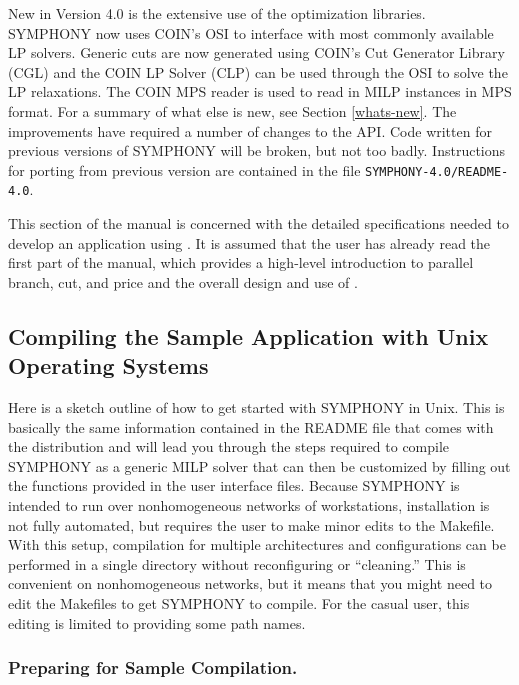 New in Version 4.0 is the extensive use of the
 optimization libraries.
SYMPHONY now uses COIN's OSI to interface with most commonly available LP
solvers. Generic cuts are now generated using COIN's Cut Generator Library
(CGL) and the COIN LP Solver (CLP) can be used through the OSI to solve the LP
relaxations. The COIN MPS reader is used to read in MILP instances in MPS
format. For a summary of what else is new, see Section \ref{whats-new}. The
improvements have required a number of changes to the API. Code written for
previous versions of SYMPHONY will be broken, but not too badly. Instructions
for porting from previous version are contained in the file
\texttt{SYMPHONY-4.0/README-4.0}.

This section of the manual is concerned with the detailed
specifications needed to develop an application using \BB. It is
assumed that the user has already read the first part of the manual, which
provides a high-level introduction to parallel branch, cut, and price
and the overall design and use of \BB. 


\subsection{Compiling the Sample Application with Unix Operating Systems}
\label{getting_started_unix}

Here is a sketch outline of how to get started with SYMPHONY in Unix. This is
basically the same information contained in the README file that comes with
the distribution and will lead you through the steps required to compile
SYMPHONY as a generic MILP solver that can then be customized by filling out
the functions provided in the user interface files. Because SYMPHONY is
intended to run over nonhomogeneous networks of workstations, installation is
not fully automated, but requires the user to make minor edits to the
Makefile.  With this setup, compilation for multiple architectures and
configurations can be performed in a single directory without reconfiguring or
``cleaning.'' This is convenient on nonhomogeneous networks, but it means that
you might need to edit the Makefiles to get SYMPHONY to compile. For the casual
user, this editing is limited to providing some path names.

\subsubsection{Preparing for Sample Compilation.}

